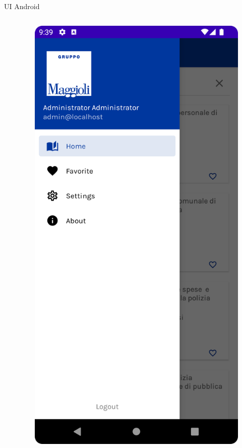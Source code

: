 \begin{frame}{UI Android}
\begin{columns}[onlytextwidth]
\begin{column}{0.24\textwidth}
        \end{column}
        \begin{column}{0.24\textwidth}
        
             \begin{figure}[H]
                \includegraphics[width=1\textwidth]{img/sidenav.png}
            \end{figure}
            

\end{column}
\end{columns}
\end{frame}
